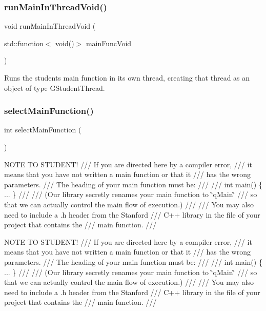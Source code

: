 \subsubsection{\texorpdfstring{run\+Main\+In\+Thread\+Void()}{runMainInThreadVoid()}\hspace{0.1cm}{\footnotesize\ttfamily [2/2]}}
{\footnotesize\ttfamily void run\+Main\+In\+Thread\+Void (\begin{DoxyParamCaption}\item[{std\+::function$<$ void()$>$}]{main\+Func\+Void }\end{DoxyParamCaption})}



Runs the student\textquotesingle{}s main function in its own thread, creating that thread as an object of type G\+Student\+Thread. 

\mbox{\label{namespacestanfordcpplib_a149b27362bd934bdcc66e9a927e8515d}} 
\subsubsection{\texorpdfstring{select\+Main\+Function()}{selectMainFunction()}}
{\footnotesize\ttfamily int select\+Main\+Function (\begin{DoxyParamCaption}{ }\end{DoxyParamCaption})}

N\+O\+TE TO S\+T\+U\+D\+E\+N\+T! /// If you are directed here by a compiler error, /// it means that you have not written a main function or that it /// has the wrong parameters. /// The heading of your main function must be\+: /// /// int main() \{ ... \} /// /// (Our library secretly renames your main function to \char`\"{}q\+Main\char`\"{} /// so that we can actually control the main flow of execution.) /// /// You may also need to include a .h header from the Stanford /// C++ library in the file of your project that contains the /// \textquotesingle{}main\textquotesingle{} function. ///

N\+O\+TE TO S\+T\+U\+D\+E\+N\+T! /// If you are directed here by a compiler error, /// it means that you have not written a main function or that it /// has the wrong parameters. /// The heading of your main function must be\+: /// /// int main() \{ ... \} /// /// (Our library secretly renames your main function to \char`\"{}q\+Main\char`\"{} /// so that we can actually control the main flow of execution.) /// /// You may also need to include a .h header from the Stanford /// C++ library in the file of your project that contains the /// \textquotesingle{}main\textquotesingle{} function. ///\mbox{\label{namespacestanfordcpplib_afa57f85846177bb4ed2b4b12fa8a758d}} 
